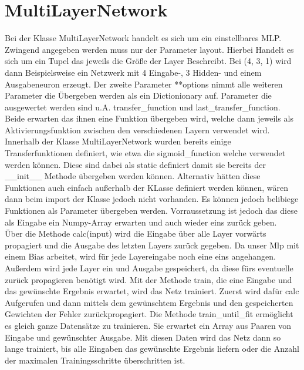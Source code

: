 \documentclass[a4paper]{article}
\title{\trtitle}
\author{\trauthor}
\date{\today}
\begin{document}
	\maketitle
	\pagebreak
	
	\section{MultiLayerNetwork}
		Bei der Klasse MultiLayerNetwork handelt es sich um ein einstellbares MLP. 
		Zwingend angegeben werden muss nur der Parameter layout. Hierbei Handelt es sich 
		um ein Tupel das jeweils die Größe der Layer Beschreibt. Bei (4, 3, 1) wird
		dann Beispielsweise ein Netzwerk mit 4 Eingabe-, 3 Hidden- und einem Ausgabeneuron 
		erzeugt. Der zweite Parameter **options nimmt alle weiteren Parameter die Übergeben
		werden als ein Dictionionary auf. Parameter die ausgewertet werden sind u.A. transfer\_function
		und last\_transfer\_function. Beide erwarten das ihnen eine Funktion übergeben wird, welche dann
		jeweils als Aktivierungsfunktion zwischen den verschiedenen Layern verwendet wird.
		Innerhalb der Klasse MultiLayerNetwork wurden bereits einige Transferfunktionen definiert,
		wie etwa die sigmoid\_function welche verwendet werden können. Diese sind dabei als static definiert
		damit sie bereits der \_\_init\_\_ Methode übergeben werden können. Alternativ hätten diese Funktionen
		auch einfach außerhalb der KLasse definiert werden können, wären dann beim import der Klasse jedoch nicht vorhanden.
		Es können jedoch belibiege Funktionen als Parameter übergeben werden. Vorraussetzung ist jedoch das diese als Eingabe
		ein Numpy-Array erwarten und auch wieder eins zurück geben. \\

		Über die Methode calc(input) wird die Eingabe über alle Layer vorwärts propagiert und die Ausgabe des letzten Layers 
		zurück gegeben. Da unser Mlp mit einem Bias arbeitet, wird für jede Layereingabe noch eine eins angehangen.
		Außerdem wird jede Layer ein und Ausgabe gespeichert, da diese fürs eventuelle zurück propagieren benötigt wird.
		Mit der Methode train, die eine Eingabe und das gewünschte Ergebnis erwartet, wird das Netz trainiert.
		Zuerst wird dafür calc Aufgerufen und dann mittels dem gewünschtem Ergebnis und den gespeicherten Gewichten der
		Fehler zurückpropagiert. 
		Die Methode train\_until\_fit ermöglicht es gleich ganze Datensätze zu trainieren. Sie erwartet ein Array aus 
		Paaren von Eingabe und gewünschter Ausgabe. Mit diesen Daten wird das Netz dann so lange trainiert, bis alle
		Eingaben das gewünschte Ergebnis liefern oder die Anzahl der maximalen Trainingsschritte überschritten ist. 
\end{document}
